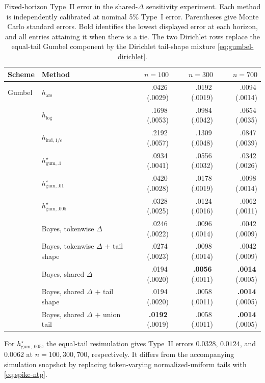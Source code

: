 \documentclass[11pt]{article}
\newcommand{\mcse}[2]{\mbox{#1\,{\fontsize{7}{8}\selectfont(#2)}}}
\newcommand{\bestmcse}[2]{\mbox{\textbf{#1}\,{\fontsize{7}{8}\selectfont(#2)}}}
\begin{document}
\begin{table}[htbp]
\centering
\small
\caption{Fixed-horizon Type~II error in the shared-$\Delta$ sensitivity experiment.  Each method is independently calibrated at nominal 5\% Type~I error.  Parentheses give Monte Carlo standard errors.  Bold identifies the lowest displayed error at each horizon, and all entries attaining it when there is a tie.  The two Dirichlet rows replace the equal-tail Gumbel component by the Dirichlet tail-shape mixture \eqref{eq:gumbel-dirichlet}.}
\label{tab:shared}
\begin{tabular}{@{}llrrr@{}}
\toprule
Scheme & Method & $n=100$ & $n=300$ & $n=700$ \\
\midrule
Gumbel & $h_{\mathrm{ars}}$ & \mcse{.0426}{.0029} & \mcse{.0192}{.0019} & \mcse{.0094}{.0014} \\
 & $h_{\log}$ & \mcse{.1698}{.0053} & \mcse{.0984}{.0042} & \mcse{.0654}{.0035} \\
 & $h_{\mathrm{ind},1/e}$ & \mcse{.2192}{.0057} & \mcse{.1309}{.0048} & \mcse{.0847}{.0039} \\
 & $h^\star_{\mathrm{gum},.1}$ & \mcse{.0934}{.0041} & \mcse{.0556}{.0032} & \mcse{.0342}{.0026} \\
 & $h^\star_{\mathrm{gum},.01}$ & \mcse{.0420}{.0028} & \mcse{.0178}{.0019} & \mcse{.0098}{.0014} \\
 & $h^\star_{\mathrm{gum},.005}$ & \mcse{.0328}{.0025} & \mcse{.0124}{.0016} & \mcse{.0062}{.0011} \\
 & Bayes, tokenwise $\Delta$ & \mcse{.0246}{.0022} & \mcse{.0096}{.0014} & \mcse{.0042}{.0009} \\
 & Bayes, tokenwise $\Delta$ $+$ tail shape & \mcse{.0274}{.0023} & \mcse{.0098}{.0014} & \mcse{.0042}{.0009} \\
 & Bayes, shared $\Delta$ & \mcse{.0194}{.0020} & \bestmcse{.0056}{.0011} & \bestmcse{.0014}{.0005} \\
 & Bayes, shared $\Delta$ $+$ tail shape & \mcse{.0194}{.0020} & \mcse{.0058}{.0011} & \bestmcse{.0014}{.0005} \\
 & Bayes, shared $\Delta$ $+$ union tail & \bestmcse{.0192}{.0019} & \mcse{.0058}{.0011} & \bestmcse{.0014}{.0005} \\
\bottomrule
\end{tabular}
\end{table}

For $h^\star_{\mathrm{gum},.005}$, the equal-tail resimulation gives Type~II errors $0.0328$, $0.0124$, and $0.0062$ at $n=100,300,700$, respectively.  It differs from the accompanying simulation snapshot by replacing token-varying normalized-uniform tails with \eqref{eq:spike-ntp}.
\end{document}
